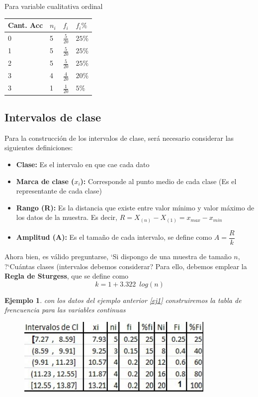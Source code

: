 \documentclass[12pt,twocolumn,a4paper]{report}
\newtheorem{ejemplo}{Ejemplo}
\begin{document}
Para variable cualitativa ordinal 
\begin{table}[H]
\begin{tabular}{|l|l|l|l|}
\hline
Cant. Acc & $n_i$ & $f_i$          & $f_i\%$ \\ \hline
0         & 5     & $\frac{5}{20}$ & $25 \%$ \\ \hline
1         & 5     & $\frac{5}{20}$ & $25 \%$ \\ \hline
2         & 5     & $\frac{5}{20}$ & $25 \%$ \\ \hline
3         & 4     & $\frac{4}{20}$ & $20 \%$ \\ \hline
3         & 1     & $\frac{1}{20}$ & $5\%$   \\ \hline
\end{tabular}
\end{table}


\subsection*{Intervalos de clase}
Para la construcción de los intervalos de clase, será necesario considerar las siguientes definiciones:
\begin{itemize}
\setlength\itemsep{0.001cm}
\item{\textbf{Clase:} Es el intervalo en que cae cada dato}
\item{\textbf{Marca de clase ($x_i$):} Corresponde al punto medio de cada clase (Es el representante de cada clase)}
\item{\textbf{Rango (R):} Es la distancia que existe entre valor mínimo y valor máximo de los datos de la muestra. Es decir, $R = X_{(n)}-X_{(1)} = x_{max}-x_{min}$}
\item{\textbf{Amplitud (A):} Es el tamaño de cada intervalo, se define como $A = \dfrac{R}{k}$} 
\end{itemize}

Ahora bien, es válido preguntarse, `Si dispongo de una muestra de tamaño $n$, ?`Cuántas clases (intervalos debemos considerar? Para ello, debemos emplear la \textbf{Regla de Sturgess}, que se define como $$ k = 1 + 3.322 \enspace log(n) $$

\begin{ejemplo}
con los datos del ejemplo anterior \ref{ej1} construiremos la tabla de frencuencia para las variables continuas  
\end{ejemplo}
\begin{figure}[H]
\centering
\includegraphics[scale=0.7]{graficos/4.png}
\end{figure}
\end{document}
